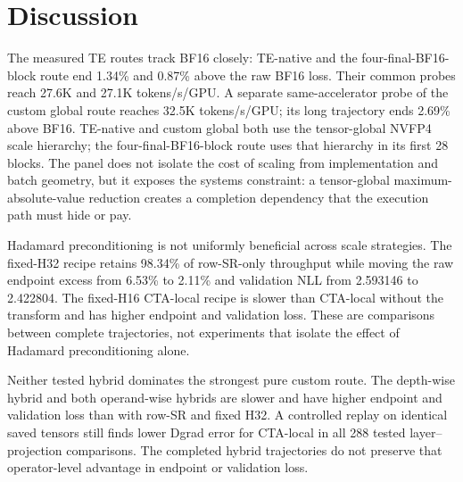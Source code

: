 \section{Discussion}

The measured TE routes track BF16 closely: TE-native and the
four-final-BF16-block route end 1.34\% and 0.87\% above the raw BF16 loss.
Their common probes reach 27.6K and 27.1K tokens/s/GPU. A separate
same-accelerator probe of the custom global \nvfp{} route reaches 32.5K
tokens/s/GPU; its long trajectory ends 2.69\% above BF16. TE-native \nvfp{}
and custom global \nvfp{} both use the tensor-global NVFP4 scale hierarchy;
the four-final-BF16-block route uses that hierarchy in its first 28 blocks.
The panel does not isolate the cost
of scaling from implementation and batch geometry, but it exposes the systems
constraint: a tensor-global maximum-absolute-value reduction creates a
completion dependency that the execution path must hide or pay.

Hadamard preconditioning is not uniformly beneficial across scale strategies.
The fixed-H32 \mxfp{} recipe retains 98.34\% of row-SR-only \mxfp{}
throughput while moving the raw endpoint excess from 6.53\% to 2.11\% and
validation NLL from 2.593146 to 2.422804. The fixed-H16 CTA-local recipe is
slower than CTA-local without the transform and has higher endpoint and
validation loss. These are comparisons between complete trajectories, not
experiments that isolate the effect of Hadamard preconditioning alone.

Neither tested hybrid dominates the strongest pure custom route. The
depth-wise hybrid and both operand-wise hybrids are slower and have higher
endpoint and validation loss than \mxfp{} with row-SR and fixed H32. A
controlled replay on identical saved tensors still finds lower Dgrad error for
CTA-local in all 288 tested layer--projection comparisons. The completed hybrid
trajectories do not preserve that operator-level advantage in endpoint or
validation loss.
